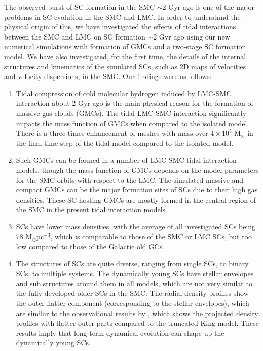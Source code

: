 \documentclass[fleqn,usenatbib]{mnras}
\begin{document}
The observed burst of SC formation in the SMC $\sim$2 Gyr ago is one of the major problems in SC evolution in the SMC and LMC. In order to understand the physical origin of this, we have investigated the effects of tidal interactions between the SMC and LMC on SC formation ${\sim}2$ Gyr ago using our new numerical simulations with formation of GMCs and a two-stage SC formation model. We have also investigated, for the first time, the details of the internal structures and kinematics of the simulated SCs, such as 2D maps of velocities and velocity dispersions, in the SMC. Our findings were as follows:
\renewcommand{\labelenumi}{(\arabic{enumi})}
 \begin{enumerate}
    \item Tidal compression of cold molecular hydrogen induced by LMC-SMC interaction about 2 Gyr ago is the main physical reason for the formation of massive gas clouds (GMCs). 
    The tidal LMC-SMC interaction significantly impacts the mass function of GMCs when compared to the isolated model. There is a three times enhancement of meshes with mass over $4\times10^{5}$ M$_\odot$ in the final time step of the tidal model compared to the isolated model.
    
    \item Such GMCs can be formed in a number of LMC-SMC tidal interaction models, though the mass function of GMCs depends on the model parameters for the SMC orbits with respect to the LMC. The simulated massive and compact GMCs can be the major formation sites of SCs due to their high gas densities. These SC-hosting GMCs are mostly formed in the central region of the SMC in the present tidal interaction models.
    
    \item SCs have lower mass densities, with the average of all investigated SCs being 78 M$_\odot$pc$^{-3}$, which is comparable to those of the SMC or LMC SCs, but too low compared to those of the Galactic old GCs. 
    
    \item The structures of SCs are quite diverse, ranging from single SCs, to binary SCs, to multiple systems. The dynamically young SCs have stellar envelopes and sub structures around them in all models, which are not very similar to the fully developed older SCs in the SMC. The radial density profiles show the outer flatter component (corresponding to the stellar envelopes), which are similar to the observational results by \cite{K31Elson_Fall_Freeman1987}, which shows the projected density profiles with flatter outer parts compared to the truncated King model. These results imply that long-term dynamical evolution can shape up the dynamically young SCs.
    

\end{enumerate}
\end{document}
